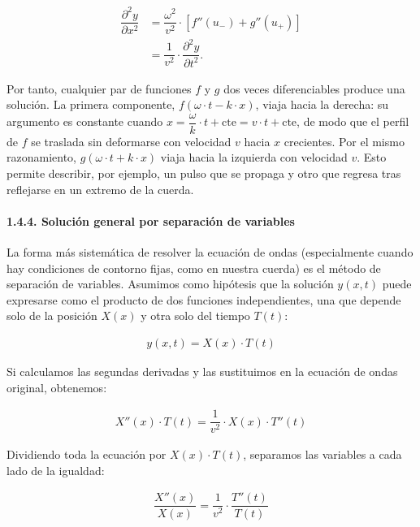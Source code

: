 \documentclass[
  spanish,
]{article}
\begin{document}
\[
\begin{aligned}
\dfrac{\partial^2 y}{\partial x^2}
&= \dfrac{\omega^2}{v^2} \cdot \left[f''(u_-) + g''(u_+)\right] \\
&= \dfrac{1}{v^2} \cdot \dfrac{\partial^2 y}{\partial t^2}.
\end{aligned}
\]

Por tanto, cualquier par de funciones \(f\) y \(g\) dos veces
diferenciables produce una solución. La primera componente,
\(f(\omega \cdot t - k \cdot x)\), viaja hacia la derecha: su argumento
es constante cuando
\(x = \dfrac{\omega}{k} \cdot t + \text{cte} = v \cdot t + \text{cte}\),
de modo que el perfil de \(f\) se traslada sin deformarse con velocidad
\(v\) hacia \(x\) crecientes. Por el mismo razonamiento,
\(g(\omega \cdot t + k \cdot x)\) viaja hacia la izquierda con velocidad
\(v\). Esto permite describir, por ejemplo, un pulso que se propaga y
otro que regresa tras reflejarse en un extremo de la cuerda.

\paragraph{1.4.4. Solución general por separación de
variables}\label{soluciuxf3n-general-por-separaciuxf3n-de-variables}

La forma más sistemática de resolver la ecuación de ondas (especialmente
cuando hay condiciones de contorno fijas, como en nuestra cuerda) es el
método de separación de variables. Asumimos como hipótesis que la
solución \(y(x,t)\) puede expresarse como el producto de dos funciones
independientes, una que depende solo de la posición \(X(x)\) y otra solo
del tiempo \(T(t)\):

\[
\begin{aligned}
y(x,t) = X(x) \cdot T(t)
\end{aligned}
\]

Si calculamos las segundas derivadas y las sustituimos en la ecuación de
ondas original, obtenemos:

\[
\begin{aligned}
X''(x) \cdot T(t) = \dfrac{1}{v^2} \cdot X(x) \cdot T''(t)
\end{aligned}
\]

Dividiendo toda la ecuación por \(X(x) \cdot T(t)\), separamos las
variables a cada lado de la igualdad:

\[
\begin{aligned}
\dfrac{X''(x)}{X(x)} = \dfrac{1}{v^2} \cdot \dfrac{T''(t)}{T(t)}
\end{aligned}
\]
\end{document}

